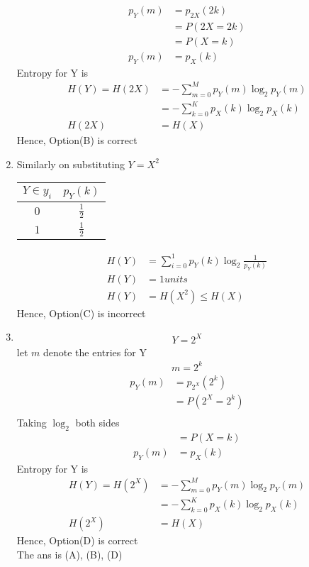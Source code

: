 \documentclass[journal,12pt,onecolumn]{IEEEtran}
\theoremstyle{remark}
\begin{document}
\begin{enumerate}
\begin{align}
p_Y(m)  &= p_{2X}(2k)\\
 &= P(2X = 2k)\\
 &= P(X= k)\\
 p_Y(m)&= p_X(k)
\end{align}
Entropy for Y is
\begin{align}
 H(Y) = H(2X)
 &= -\sum_{m = 0}^{M}p_Y(m)\log _{2}p_Y(m)\\
 &= -\sum_{k = 0}^{K}p_X(k) \log _{2}p_X(k)\\
H(2X) &= H(X)
 \end{align}
 Hence, Option(B) is correct\\
 \item Similarly on substituting $Y = X^2$\\
  \begin{table}[htpb]
\centering 
\begin{tabular}{|c|c|}
\hline
$Y \in y_i$	&	$p_Y(k)$\\
\hline
$0$                         & $\frac{1}{2} $       \\
\hline
$1$                         & $\frac{1}{2} $ \\
\hline
\end{tabular}
\end{table}
 \begin{align}
H(Y) &= \sum_{i=0}^{1}p_Y(k) \log _{2} \frac{1}{p_Y(k)}\\
H(Y) &=  1units\\
  H(Y) &= H(X^2) \leq H(X)
 \end{align}
 Hence, Option(C) is incorrect\\
 \item \begin{align}
Y = 2^X
\end{align}
let $m$ denote the entries for Y 
\begin{align}
m = 2^k
\end{align}
\begin{align}
p_Y(m)  &= p_{2^X}(2^k)\\
 &= P(2^X = 2^k)\\
\end{align}
Taking $\log _{2}$ both sides
\begin{align}
 &= P(X= k)\\
 p_Y(m)&= p_X(k)
\end{align}
Entropy for Y is
\begin{align}
 H(Y) = H(2^X)
 &= -\sum_{m = 0}^{M}p_Y(m)\log _{2}p_Y(m)\\
 &= -\sum_{k = 0}^{K}p_X(k) \log _{2}p_X(k)\\
H(2^X) &= H(X)
 \end{align}
 Hence, Option(D) is correct\\
 The ans is (A), (B), (D)
 \end{enumerate}
\end{document}
